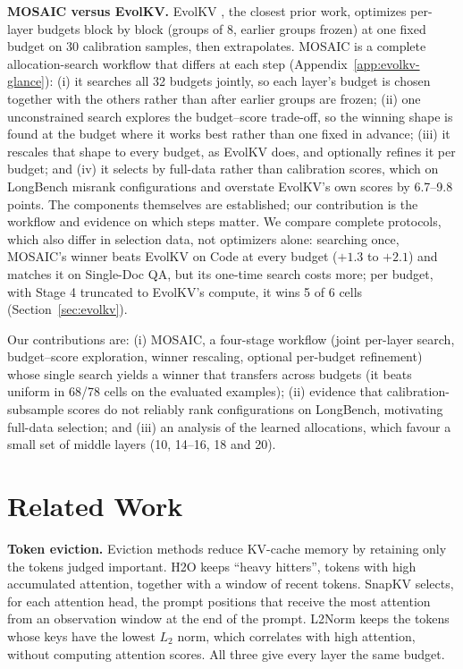 \documentclass[11pt]{article}
\begin{document}
\textbf{MOSAIC versus EvolKV.}\label{sec:intro-evolkv} EvolKV \citep{yu2025evolkv}, the closest prior work, optimizes per-layer budgets block by block (groups of 8, earlier groups frozen) at one fixed budget on 30 calibration samples, then extrapolates. MOSAIC is a complete allocation-search workflow that differs at each step (Appendix~\ref{app:evolkv-glance}): (i) it searches all 32 budgets jointly, so each layer's budget is chosen together with the others rather than after earlier groups are frozen; (ii) one unconstrained search explores the budget--score trade-off, so the winning shape is found at the budget where it works best rather than one fixed in advance; (iii) it rescales that shape to every budget, as EvolKV does, and optionally refines it per budget; and (iv) it selects by full-data rather than calibration scores, which on LongBench misrank configurations and overstate EvolKV's own scores by 6.7--9.8 points. The components themselves are established; our contribution is the workflow and evidence on which steps matter. We compare complete protocols, which also differ in selection data, not optimizers alone: searching once, MOSAIC's winner beats EvolKV on Code at every budget ($+1.3$ to $+2.1$) and matches it on Single-Doc QA, but its one-time search costs more; per budget, with Stage 4 truncated to EvolKV's compute, it wins 5 of 6 cells (Section~\ref{sec:evolkv}).

Our contributions are: (i) MOSAIC, a four-stage workflow (joint per-layer search, budget--score exploration, winner rescaling, optional per-budget refinement) whose single search yields a winner that transfers across budgets (it beats uniform in 68/78 cells on the evaluated examples); (ii) evidence that calibration-subsample scores do not reliably rank configurations on LongBench, motivating full-data selection; and (iii) an analysis of the learned allocations, which favour a small set of middle layers (10, 14--16, 18 and 20).

\section{Related Work}

\textbf{Token eviction.} Eviction methods reduce KV-cache memory by retaining only the tokens judged important. H2O \citep{zhang2023h2o} keeps ``heavy hitters'', tokens with high accumulated attention, together with a window of recent tokens. SnapKV \citep{li2024snapkv} selects, for each attention head, the prompt positions that receive the most attention from an observation window at the end of the prompt. L2Norm \citep{devoto2024l2norm} keeps the tokens whose keys have the lowest $L_2$ norm, which correlates with high attention, without computing attention scores. All three give every layer the same budget.
\end{document}
